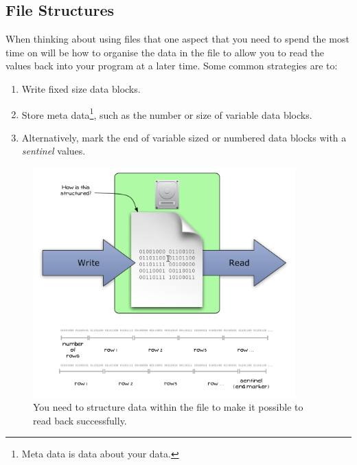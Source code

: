 \clearpage
\subsection{File Structures} %
\label{sub:file_structures}

When thinking about using files that one aspect that you need to spend the most time on will be how to organise the data in the file to allow you to read the values back into your program at a later time. Some common strategies are to:

\begin{enumerate}
  \item Write fixed size data blocks.
  \item Store meta data\footnote{Meta data is data about your data.}, such as the number or size of variable data blocks.
  \item Alternatively, mark the end of variable sized or numbered data blocks with a \emph{sentinel} values.
\end{enumerate}

\begin{figure}[h]
   \centering
   \includegraphics[width=0.9\textwidth]{./topics/file-io/diagrams/FileStructures} 
   \caption{You need to structure data within the file to make it possible to read back successfully.}
   \label{fig:file-structures}
\end{figure}


